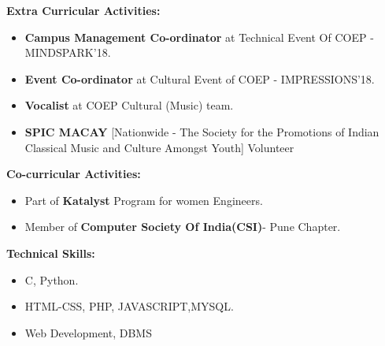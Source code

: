 \documentclass[a4paper,11pt]{article}
\begin{document}
\begin{minipage}[t]{0.5\textwidth}
			\raggedright\smallskip
			\begin{LARGE}
				\Large \textbf{Extra Curricular Activities:}\medskip%
				{\small
					\begin{itemize}
						\item {\textbf{Campus Management Co-ordinator} at Technical Event Of COEP - MINDSPARK'18.}
						\item {\textbf{Event Co-ordinator} at Cultural Event of COEP - IMPRESSIONS'18.}
						\item {\textbf{Vocalist} at COEP Cultural (Music) team.}
						\item {\textbf{SPIC MACAY} [Nationwide - The Society for the Promotions of Indian Classical Music and Culture Amongst Youth] Volunteer }
					\end{itemize}
				}
			\end{LARGE}
			\vspace{0.5cm}
\begin{LARGE}
			\textbf{Co-curricular Activities:}\medskip%
				{\small
					\begin{itemize}
						\item {Part of \textbf{Katalyst} Program for women Engineers.}
						\item {Member of \textbf{Computer Society Of India(CSI)}- Pune Chapter}.
					\end{itemize}
				}
				
			\end{LARGE}
			\vspace{0.5cm}
\begin{LARGE}
				\Large \textbf{Technical Skills:}\medskip%
				{\small
					\begin{itemize}
						\item {C, Python.}
						\item {HTML-CSS, PHP, JAVASCRIPT,MYSQL.}
						\item {Web Development, DBMS}
					\end{itemize}
				}
			\end{LARGE}
			
			\vspace{0.7cm}
\end{minipage}%
\hspace{0.6cm}
\end{document}
